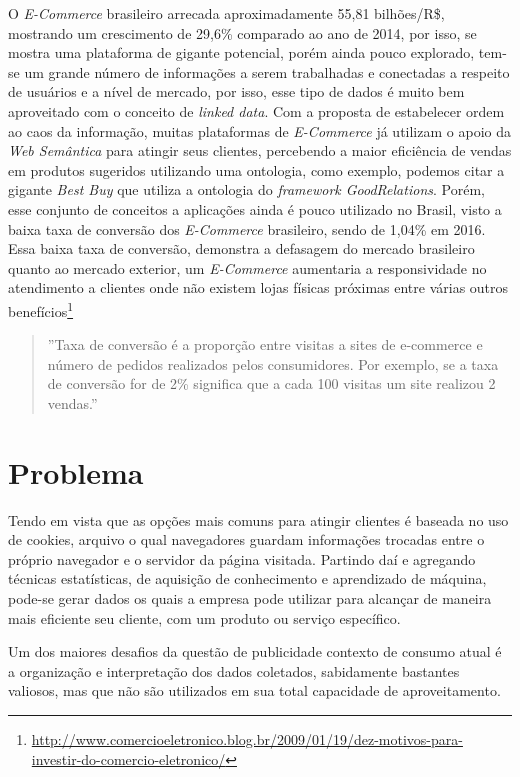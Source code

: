 O \textit{E-Commerce} brasileiro arrecada aproximadamente 55,81 bilhões/R\$, mostrando um crescimento de 29,6\% comparado ao ano de 2014, por isso, se mostra uma plataforma de gigante potencial, porém ainda pouco explorado, tem-se um grande número de informações a serem trabalhadas e conectadas a respeito de usuários e a nível de mercado, por isso, esse tipo de dados é muito bem aproveitado com o conceito de \textit{linked data}\cite{berners:2001}. Com a proposta de estabelecer ordem ao caos da informação, muitas plataformas de \textit{E-Commerce} já utilizam o apoio da \textit{Web Semântica} para atingir seus clientes, percebendo a maior eficiência de vendas em produtos sugeridos utilizando uma ontologia, como exemplo, podemos citar a gigante \textit{Best Buy}
que utiliza a ontologia do \textit{framework GoodRelations}. Porém, esse conjunto de conceitos a aplicações ainda é pouco utilizado no Brasil, visto a baixa taxa de conversão dos \textit{E-Commerce} brasileiro, sendo de 1,04\% em 2016. Essa baixa taxa de conversão, demonstra a defasagem do mercado brasileiro quanto ao mercado exterior, um \textit{E-Commerce} aumentaria a responsividade no atendimento a clientes onde não existem lojas físicas próximas entre várias outros benefícios\footnote{\url{http://www.comercioeletronico.blog.br/2009/01/19/dez-motivos-para-investir-do-comercio-eletronico/}}

\begin{quote}''Taxa de conversão é a proporção entre visitas a sites de
e-commerce e número de pedidos realizados pelos
consumidores. Por exemplo, se a taxa de conversão for de
2\% significa que a cada 100 visitas um site realizou 2
vendas\cite{convension:2016}.''
\end{quote}

\section{Problema}

Tendo em vista que as opções mais comuns para atingir clientes é baseada no uso de cookies, arquivo o qual navegadores guardam informações trocadas entre o próprio navegador e o servidor da página visitada. Partindo daí e agregando técnicas estatísticas, de aquisição de conhecimento e aprendizado de máquina, pode-se gerar dados os quais a empresa pode utilizar para alcançar de maneira mais eficiente seu cliente, com um produto ou serviço específico\cite{boland:2014}.

Um dos maiores desafios da questão de publicidade contexto de consumo atual é a organização e interpretação dos dados coletados, sabidamente bastantes valiosos, mas que não são utilizados em sua total capacidade de aproveitamento\cite{zamanzadeh:2013}.

